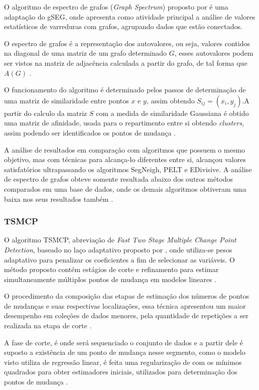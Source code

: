 O algoritmo de espectro de grafos (\textit{Graph Spectrum}) proposto por \cite{Uzai2019} é uma adaptação do gSEG, onde apresenta como atividade principal a análise de valores estatísticos de varreduras com grafos, agrupando dados que estão conectados.

O espectro de grafos é a representação dos autovalores, ou seja, valores contidos na diagonal de uma matriz de um grafo determinado $G$, esses autovalores podem ser vistos na matriz de adjacência calculada a partir do grafo, de tal forma que $A(G)$ \cite{Uzai2019}.

O funcionamento do algoritmo é determinado pelos passos de determinação de uma matriz de similaridade entre pontos $x$ e $y$, assim obtendo $S_{ij} = (x_{i}, y_{j})$.A partir do calculo da matriz $S$ com a medida de similaridade Gaussiana é obtido uma matriz de afinidade, usada para o repartimento entre si obtendo \textit{clusters}, assim podendo ser identificados os pontos de mudança \cite{Uzai2019}.

A análise de resultados em comparação com algoritmos que possuem o mesmo objetivo, mas com técnicas para alcança-lo diferentes entre si, alcançou valores satisfatórios ultrapassando os algoritmos SegNeigh, PELT e EDivisive. A análise de espectro de grafos obteve somente resultada abaixo dos outros métodos comparados em uma base de dados, onde os demais algoritmos obtiveram uma baixa nos seus resultados também \cite{Uzai2019}.

\subsubsection{TSMCP}

O algoritmo TSMCP, abreviação de \textit{Fast Two Stage Multiple Change Point Detection}, baseado no laço adaptativo proposto por \cite{Zou2006}, onde utiliza-se pesos adaptativo para penalizar os coeficientes a fim de selecionar as variáveis. O método proposto contém estágios de corte e refinamento para estimar simultaneamente múltiplos pontos de mudança em modelos lineares \cite{Jin2016}.

O procedimento da composição das etapas de estimação dos números de pontos de mudanças e suas respectivas localizações, essa técnica apresentou um maior desempenho em coleções de dados menores, pela quantidade de repetições a ser realizada na etapa de corte \cite{Jin2016}.

A fase de corte, é onde será sequenciado o conjunto de dados e a partir dele é suposto a existência de um ponto de mudança nesse segmento, como o modelo visto utiliza de regressão linear, é feita uma regularização de com os mínimos quadrados para obter estimadores iniciais, utilizados para determinação dos pontos de mudança \cite{Jin2016}.

